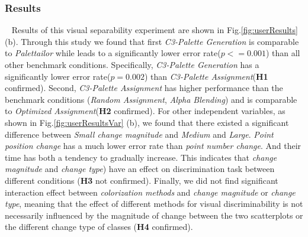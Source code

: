 \subsubsection{Results}
\
\newline
Results of this visual separability experiment are shown in Fig.\ref{fig:userResults} (b).
Through this study we found that first \emph{C3-Palette Generation} is comparable to \emph{Palettailor} while leads to a significantly lower error rate(\emph{$p<=0.001$}) than all other benchmark conditions. Specifically, \emph{C3-Palette Generation} has a significantly lower error rate(\emph{$p=0.002$}) than \emph{C3-Palette Assignment}(\textbf{H1} confirmed).
Second, \emph{C3-Palette Assignment} has higher performance than the benchmark conditions (\emph{Random Assignment}, \emph{Alpha Blending}) and is comparable to \emph{Optimized Assignment}(\textbf{H2} confirmed).
For other independent variables, as shown in Fig.\ref{fig:userResultsVar} (b), we found that there existed a significant difference between \emph{Small change magnitude} and \emph{Medium} and \emph{Large}. \emph{Point position change} has a much lower error rate than \emph{point number change}. And their time has both a tendency to gradually increase. This indicates that \emph{change magnitude} and \emph{change type}) have an effect on discrimination task between different conditions (\textbf{H3} not confirmed).
Finally, we did not find significant interaction effect between \emph{colorization methods} and \emph{change magnitude} or \emph{change type}, meaning that the effect of different methods for visual discriminability is not
necessarily influenced by the magnitude of change between the two scatterplots or the different change type of classes (\textbf{H4} confirmed).
\vspace{.3em}
